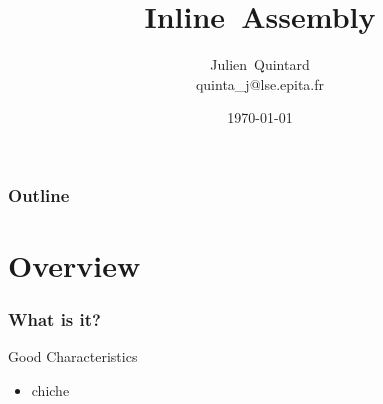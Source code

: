 \documentclass{beamer}
\title[Inline~Assembly]{Inline~Assembly}
\author[Julien~Quintard]
{
  Julien~Quintard\inst{1} \\
  {\tiny quinta\_j@lse.epita.fr}
}
\institute[EPITA Computer System Laboratory]
{
  \inst{1} EPITA Computer System Laboratory
}
\date[\today]{\today}
\begin{document}
%
%

\begin{frame}
  \titlepage
\end{frame}

%
%

\begin{frame}
  \frametitle{Outline}
  \tableofcontents
\end{frame}

%
%

\section{Overview}


\begin{frame}
  \frametitle{What is it?}

  \begin{block}{Good Characteristics}
    \begin{itemize}
      \item
	chiche
    \end{itemize}
  \end{block}

\end{frame}
\end{document}
